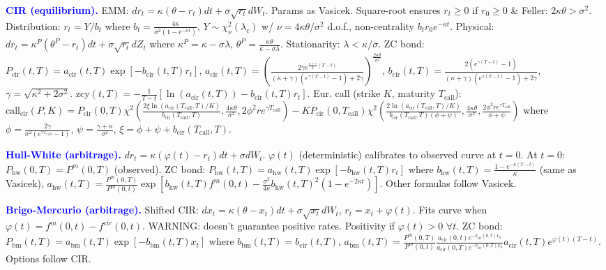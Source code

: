 \documentclass[landscape]{article}
\begin{document}
\begin{multicols}{4}
\textcolor{blue}{\textbf{CIR (equilibrium).}} EMM: $dr_t=\kappa(\theta-r_t)dt+\sigma\sqrt{r_t}dW_t$. Params as Vasicek. Square-root ensures $r_t\geq 0$ if $r_0\geq 0$ \& Feller: $2\kappa\theta>\sigma^2$. Distribution: $r_t=Y/b_t$ where $b_t=\frac{4\kappa}{\sigma^2(1-e^{-\kappa t})}$, $Y\sim\chi^2_\nu(\lambda_c)$ w/ $\nu=4\kappa\theta/\sigma^2$ d.o.f., non-centrality $b_t r_0 e^{-\kappa t}$. Physical: $dr_t=\kappa^P(\theta^P-r_t)dt+\sigma\sqrt{r_t}dZ_t$ where $\kappa^P=\kappa-\sigma\lambda$, $\theta^P=\frac{\kappa\theta}{\kappa-\sigma\lambda}$. Stationarity: $\lambda<\kappa/\sigma$. ZC bond: $P_{\text{cir}}(t,T)=a_{\text{cir}}(t,T)\exp[-b_{\text{cir}}(t,T)r_t]$, $a_{\text{cir}}(t,T)=(\frac{2\gamma e^{\frac{\kappa+\gamma}{2}(T-t)}}{(\kappa+\gamma)(e^{\gamma(T-t)}-1)+2\gamma})^{\frac{2\kappa\theta}{\sigma^2}}$, $b_{\text{cir}}(t,T)=\frac{2(e^{\gamma(T-t)}-1)}{(\kappa+\gamma)(e^{\gamma(T-t)}-1)+2\gamma}$, $\gamma=\sqrt{\kappa^2+2\sigma^2}$. $\text{zcy}(t,T)=-\frac{1}{T-t}[\ln(a_{\text{cir}}(t,T))-b_{\text{cir}}(t,T)r_t]$. Eur. call (strike $K$, maturity $T_{\text{call}}$): $\text{call}_{\text{cir}}(P,K)=P_{\text{cir}}(0,T)\chi^2(\frac{2\xi\ln(a_{\text{cir}}(T_{\text{call}},T)/K)}{b_{\text{cir}}(T_{\text{call}},T)},\frac{4\kappa\theta}{\sigma^2},2\phi^2re^{\gamma T_{\text{call}}})-KP_{\text{cir}}(0,T_{\text{call}})\chi^2(\frac{2\ln(a_{\text{cir}}(T_{\text{call}},T)/K)}{b_{\text{cir}}(T_{\text{call}},T)(\phi+\psi)},\frac{4\kappa\theta}{\sigma^2},\frac{2\phi^2re^{\gamma T_{\text{call}}}}{\phi+\psi})$ where $\phi=\frac{2\gamma}{\sigma^2(e^{\gamma T_{\text{call}}}-1)}$, $\psi=\frac{\gamma+\kappa}{\sigma^2}$, $\xi=\phi+\psi+b_{\text{cir}}(T_{\text{call}},T)$.

\textcolor{blue}{\textbf{Hull-White (arbitrage).}} $dr_t=\kappa(\varphi(t)-r_t)dt+\sigma dW_t$. $\varphi(t)$ (deterministic) calibrates to observed curve at $t=0$. At $t=0$: $P_{\text{hw}}(0,T)=P^m(0,T)$ (observed). ZC bond: $P_{\text{hw}}(t,T)=a_{\text{hw}}(t,T)\exp[-b_{\text{hw}}(t,T)r_t]$ where $b_{\text{hw}}(t,T)=\frac{1-e^{-\kappa(T-t)}}{\kappa}$ (same as Vasicek), $a_{\text{hw}}(t,T)=\frac{P^m(0,T)}{P^m(0,t)}\exp[b_{\text{hw}}(t,T)f^m(0,t)-\frac{\sigma^2}{4\kappa}b_{\text{hw}}(t,T)^2(1-e^{-2\kappa t})]$. Other formulas follow Vasicek.

\textcolor{blue}{\textbf{Brigo-Mercurio (arbitrage).}} Shifted CIR: $dx_t=\kappa(\theta-x_t)dt+\sigma\sqrt{x_t}dW_t$, $r_t=x_t+\varphi(t)$. Fits curve when $\varphi(t)=f^m(0,t)-f^{cir}(0,t)$. WARNING: doesn't guarantee positive rates. Positivity if $\varphi(t)>0$ $\forall t$. ZC bond: $P_{\text{bm}}(t,T)=a_{\text{bm}}(t,T)\exp[-b_{\text{bm}}(t,T)x_t]$ where $b_{\text{bm}}(t,T)=b_{\text{cir}}(t,T)$, $a_{\text{bm}}(t,T)=\frac{P^m(0,T)}{P^m(0,t)}\frac{a_{\text{cir}}(0,t)e^{-b_{\text{cir}}(0,t)x_0}}{a_{\text{cir}}(0,T)e^{-b_{\text{cir}}(0,T)x_0}}a_{\text{cir}}(t,T)e^{\varphi(t)(T-t)}$. Options follow CIR.


\end{multicols}
\end{document}
